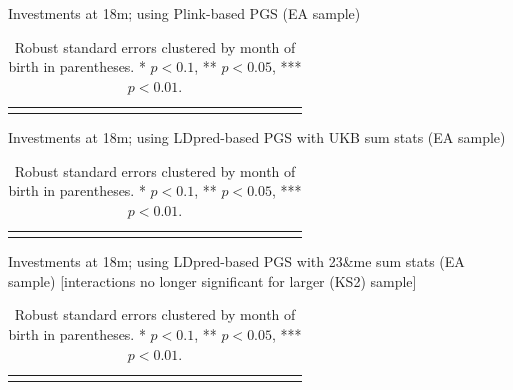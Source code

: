 \documentclass{article}
\begin{document}
\begin{table}[H]
\caption{Investments at 18m; using Plink-based PGS (EA sample)}
\centering
{\scriptsize
\begin{tabular}{lcccccccccccccccccccc}
\toprule

\bottomrule
\addlinespace[.75ex]
\end{tabular}
}
\caption*{\noindent\scriptsize Robust standard errors clustered by month of birth in parentheses. * $p < 0.1$, ** $p < 0.05$, *** $p < 0.01$.}
\end{table}

%


\begin{table}[H]
\caption{Investments at 18m; using LDpred-based PGS with UKB sum stats (EA sample)}
\centering
{\scriptsize
\begin{tabular}{lcccccccccccccccccccc}
\toprule

\bottomrule
\addlinespace[.75ex]
\end{tabular}
}
\caption*{\noindent\scriptsize Robust standard errors clustered by month of birth in parentheses. * $p < 0.1$, ** $p < 0.05$, *** $p < 0.01$.}
\end{table}

%


\begin{table}[H]
\caption{Investments at 18m; using LDpred-based PGS with 23\&me sum stats (EA sample) [interactions no longer significant for larger (KS2) sample]}
\centering
{\scriptsize
\begin{tabular}{lcccccccccccccccccccc}
\toprule

\bottomrule
\addlinespace[.75ex]
\end{tabular}
}
\label{tab:Inv18m_23me}
\caption*{\noindent\scriptsize Robust standard errors clustered by month of birth in parentheses. * $p < 0.1$, ** $p < 0.05$, *** $p < 0.01$.}
\end{table}
\end{document}
